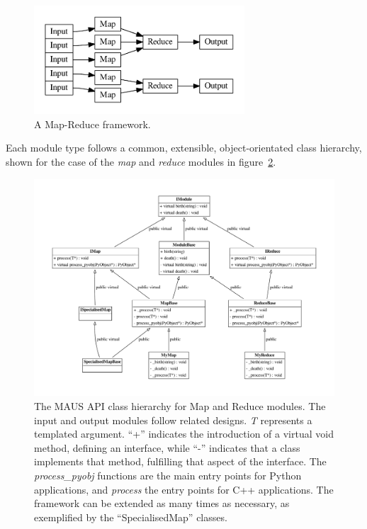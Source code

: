 \documentclass[11pt,a4paper]{article}
\begin{document}
\begin{figure}[!htb]
\centering
\includegraphics[width=0.7\textwidth]{figs/map_reduce.pdf}
\caption{A Map-Reduce framework.}
\label{fig:mapreduce}
\end{figure}

\noindent Each module type follows a common, extensible, object-orientated class hierarchy, shown for the case of the \textit{map} and \textit{reduce} modules in figure~\ref{fig:api}. 

\begin{figure}[!htb]
\centering
\includegraphics[width=1.0\textwidth]{figs/api.pdf}
\caption{The MAUS API class hierarchy for Map and Reduce modules. The input and output modules follow related designs. \emph{T} represents a templated argument. ``+'' indicates the introduction of a virtual void method, defining an interface, while ``-'' indicates that a class implements that method, fulfilling that aspect of the interface. The  \emph{process\_pyobj} functions are the main entry points for Python applications, and \emph{process} the entry points for C++ applications. The framework can be extended as many times as  necessary, as exemplified by the ``SpecialisedMap'' classes.}
\label{fig:api}
\end{figure}
\end{document}
